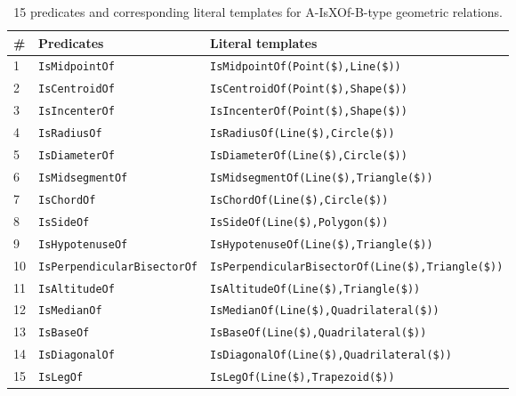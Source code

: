 \begin{table}[ht]
\footnotesize
\centering 
\begin{tabular}{lll}
	\toprule
	\# & \textbf{Predicates} & \textbf{Literal templates} \\
	\midrule
	1 & \texttt{IsMidpointOf} & \texttt{IsMidpointOf(Point(\$),Line(\$))}\\
	2 &\texttt{IsCentroidOf} & \texttt{IsCentroidOf(Point(\$),Shape(\$))} \\
	3 &\texttt{IsIncenterOf} & \texttt{IsIncenterOf(Point(\$),Shape(\$))}\\
	4 &\texttt{IsRadiusOf} & \texttt{IsRadiusOf(Line(\$),Circle(\$))}\\
	5 & \texttt{IsDiameterOf}& \texttt{IsDiameterOf(Line(\$),Circle(\$))}\\
	6 & \texttt{IsMidsegmentOf} & \texttt{IsMidsegmentOf(Line(\$),Triangle(\$))}\\
	7 &	\texttt{IsChordOf} &\texttt{IsChordOf(Line(\$),Circle(\$))}\\
	8 &	\texttt{IsSideOf} & \texttt{IsSideOf(Line(\$),Polygon(\$))}\\
	9 &\texttt{IsHypotenuseOf} & \texttt{IsHypotenuseOf(Line(\$),Triangle(\$))}\\
    10 & \texttt{IsPerpendicularBisectorOf}	& \texttt{IsPerpendicularBisectorOf(Line(\$),Triangle(\$))}\\
    11 & \texttt{IsAltitudeOf} & \texttt{IsAltitudeOf(Line(\$),Triangle(\$))}\\
    12 & \texttt{IsMedianOf} & \texttt{IsMedianOf(Line(\$),Quadrilateral(\$))}\\
	13 & \texttt{IsBaseOf} & \texttt{IsBaseOf(Line(\$),Quadrilateral(\$))}\\
	14 & \texttt{IsDiagonalOf} & \texttt{IsDiagonalOf(Line(\$),Quadrilateral(\$))}\\
	15 & \texttt{IsLegOf} & \texttt{IsLegOf(Line(\$),Trapezoid(\$))}\\
	\bottomrule
\end{tabular}
\caption{15 predicates and corresponding literal templates for A-IsXOf-B-type geometric relations.}
\label{appex:predicate5}
\end{table}

